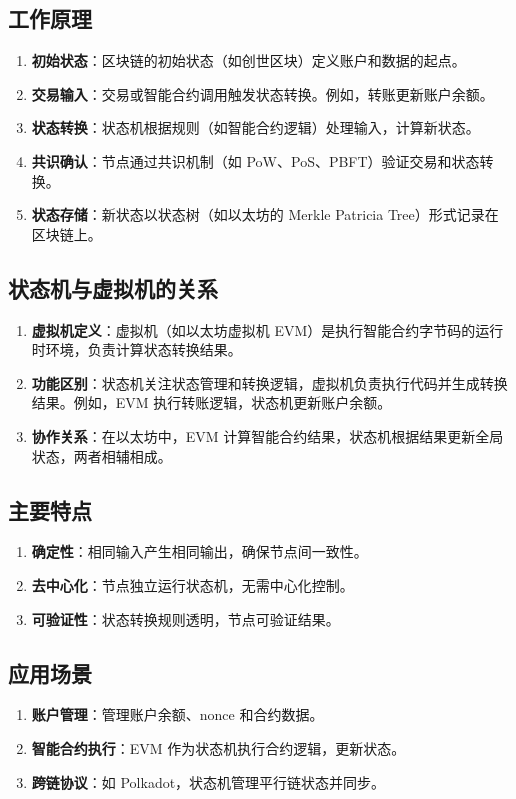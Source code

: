 \documentclass[12pt]{ctexart}
\begin{document}
\subsection{工作原理}
\begin{enumerate}
    \item \textbf{初始状态}：区块链的初始状态（如创世区块）定义账户和数据的起点。
    \item \textbf{交易输入}：交易或智能合约调用触发状态转换。例如，转账更新账户余额。
    \item \textbf{状态转换}：状态机根据规则（如智能合约逻辑）处理输入，计算新状态。
    \item \textbf{共识确认}：节点通过共识机制（如 PoW、PoS、PBFT）验证交易和状态转换。
    \item \textbf{状态存储}：新状态以状态树（如以太坊的 Merkle Patricia Tree）形式记录在区块链上。
\end{enumerate}

\subsection{状态机与虚拟机的关系}
\begin{enumerate}
    \item \textbf{虚拟机定义}：虚拟机（如以太坊虚拟机 EVM）是执行智能合约字节码的运行时环境，负责计算状态转换结果。
    \item \textbf{功能区别}：状态机关注状态管理和转换逻辑，虚拟机负责执行代码并生成转换结果。例如，EVM 执行转账逻辑，状态机更新账户余额。
    \item \textbf{协作关系}：在以太坊中，EVM 计算智能合约结果，状态机根据结果更新全局状态，两者相辅相成。
\end{enumerate}

\subsection{主要特点}
\begin{enumerate}
    \item \textbf{确定性}：相同输入产生相同输出，确保节点间一致性。
    \item \textbf{去中心化}：节点独立运行状态机，无需中心化控制。
    \item \textbf{可验证性}：状态转换规则透明，节点可验证结果。
\end{enumerate}

\subsection{应用场景}
\begin{enumerate}
    \item \textbf{账户管理}：管理账户余额、nonce 和合约数据。
    \item \textbf{智能合约执行}：EVM 作为状态机执行合约逻辑，更新状态。
    \item \textbf{跨链协议}：如 Polkadot，状态机管理平行链状态并同步。
\end{enumerate}
\end{document}
